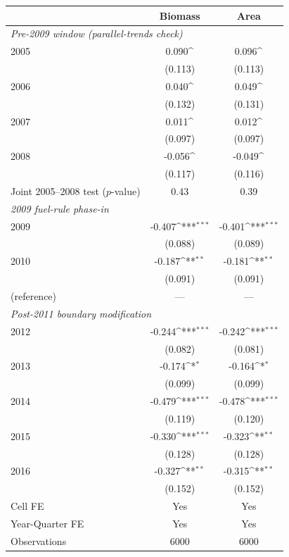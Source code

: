 \def\sym#1{\ifmmode^{#1}\else\(^{#1}\)\fi}
\begin{tabular}{l*{2}{c}}
\hline\hline
 &\multicolumn{1}{c}{Biomass}&\multicolumn{1}{c}{Area}\\
\hline
\multicolumn{3}{l}{\emph{Pre-2009 window (parallel-trends check)}}\\
2005 &0.090\sym{}&0.096\sym{}\\
 &(0.113)&(0.113)\\
2006 &0.040\sym{}&0.049\sym{}\\
 &(0.132)&(0.131)\\
2007 &0.011\sym{}&0.012\sym{}\\
 &(0.097)&(0.097)\\
2008 &-0.056\sym{}&-0.049\sym{}\\
 &(0.117)&(0.116)\\
\quad Joint 2005--2008 test ($p$-value) &0.43&0.39\\
[0.4em]
\multicolumn{3}{l}{\emph{2009 fuel-rule phase-in}}\\
2009 &-0.407\sym{***}&-0.401\sym{***}\\
 &(0.088)&(0.089)\\
2010 &-0.187\sym{**}&-0.181\sym{**}\\
 &(0.091)&(0.091)\\
\quad 2011 (reference) &---&---\\
[0.4em]
\multicolumn{3}{l}{\emph{Post-2011 boundary modification}}\\
2012 &-0.244\sym{***}&-0.242\sym{***}\\
 &(0.082)&(0.081)\\
2013 &-0.174\sym{*}&-0.164\sym{*}\\
 &(0.099)&(0.099)\\
2014 &-0.479\sym{***}&-0.478\sym{***}\\
 &(0.119)&(0.120)\\
2015 &-0.330\sym{***}&-0.323\sym{**}\\
 &(0.128)&(0.128)\\
2016 &-0.327\sym{**}&-0.315\sym{**}\\
 &(0.152)&(0.152)\\
\hline
Cell FE &Yes&Yes\\
Year-Quarter FE &Yes&Yes\\
Observations &6000&6000\\
\hline\hline
\end{tabular}
